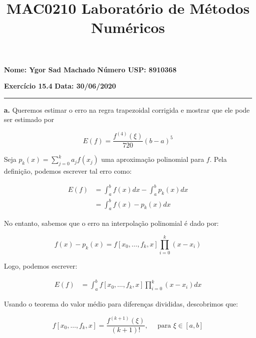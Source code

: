 \documentclass[11pt]{amsart}
\begin{document}
\parindent=0pt

\title[MAC0210]
{MAC0210 Laboratório de Métodos Numéricos}\vspace{3\jot}%

\footskip=28pt

\maketitle
\pagestyle{plain}

\textbf{Nome: Ygor Sad Machado}\hfill
\textbf{Número USP: 8910368}\null

\medskip
\textbf{Exercício 15.4}\hfill
\textbf{Data: 30/06/2020}\null

\rule{\textwidth}{0.4pt}

\textbf{a.}
Queremos estimar o erro na regra trapezoidal corrigida e mostrar que ele pode ser estimado por

\begin{equation}
    E(f) = \frac{f^{(4)}(\xi)}{720} (b-a)^5
\end{equation}

\bigskip
Seja $p_k(x) = \sum_{j=0}^k a_j f(x_j)$ uma aproximação polinomial para $f$. Pela definição, podemos escrever tal erro como:

\begin{align*}
    E(f) &= \int_a^b f(x) dx - \int_a^b p_k(x) dx\\
         &= \int_a^b f(x) - p_k(x) dx
\end{align*}

\bigskip
No entanto, sabemos que o erro na interpolação polinomial é dado por:

\begin{equation}
    f(x) - p_k(x) = f[x_0, \dots, f_k, x] \prod_{i=0}^k (x - x_i)
\end{equation}

\bigskip
Logo, podemos escrever:

\begin{align}
    E(f) &= \int_a^b f[x_0, \dots, f_k, x] \prod_{i=0}^k (x - x_i) dx \label{expanded_error}
\end{align}

\bigskip
Usando o teorema do valor médio para diferenças divididas, descobrimos que:

\begin{equation}
    f[x_0, \dots, f_k, x] = \frac{f^{(k+1)}(\xi)}{(k+1)!}, \quad \text{ para } \xi \in [a, b] \label{mean_diff}
\end{equation}
\end{document}
